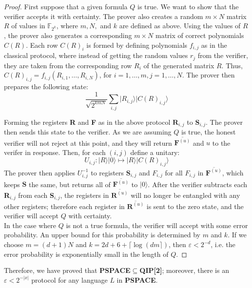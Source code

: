 \documentclass[12pt]{article}
\newcommand{\ket}[1]{\vert #1 \rangle}
\begin{document}
	\begin{proof}
		First suppose that a given formula $Q$ is true. We want to show that the verifier accepts it with certainty. The prover also creates a random $m\times N$ matrix $R$ of values in $\mathbb{F}_{2^k}$, where $m,N,$ and $k$ are defined as above. Using the values of $R$, the prover also generates a corresponding $m\times N$ matrix of correct polynomials $C(R)$. Each row $C(R)_i$ is formed by defining polynomials $f_{i,j}$ as in the classical protocol, where instead of getting the random values $r_j$ from the verifier, they are taken from the corresponding row $R_i$ of the generated matrix $R$. Thus, $C(R)_{i,j}=f_{i,j}(R_{i,1},\dots,R_{i,N})$, for $i=1,\dots,m,j=1,\dots,N$. The prover then prepares the following state:
		\[\frac{1}{\sqrt{2^{kmN}}}\sum_{i,j}\ket{R_{i,j}}\ket{C(R)_{i,j}}\]
		
		Forming the registers \textbf{R} and \textbf{F} as in the above protocol $\textbf{R}_{i,j}$ to $\textbf{S}_{i,j}$. The prover then sends this state to the verifier. As we are assuming $Q$ is true, the honest verifier will not reject at this point, and they will return $\overline{\textbf{F}^{(u)}}$ and $u$ to the verifer in response. Then, for each $(i,j)$ define a unitary:
		\[U_{i,j}:\ket{R}\ket{0}\mapsto\ket{R}\ket{C(R)_{i,j}}\]
		The prover then applies $U_{i,j}^{-1}$ to registers $\textbf{S}_{i,j}$ and $F_{i,j}$ for all $F_{i,j}$ in $\overline{\textbf{F}^{(u)}}$, which keeps $\textbf{S}$ the same, but returns all of $\overline{\textbf{F}^{(u)}}$ to $\ket{0}$. After the verifier subtracts each \textbf{R}$_{i,j}$ from each \textbf{S}$_{i,j}$, the registers in $\overline{\textbf{R}^{(u)}}$ will no longer be entangled with any other registers; therefore each register in $\overline{\textbf{R}^{(u)}}$ is sent to the zero state, and the verifier will accept $Q$ with certainty.\\
		In the case where $Q$ is not a true formula, the verifier will accept with some error probability. An upper bound for this probability is determined by $m$ and $k$. If we choose $m=(d+1)N$ and $k=2d+6+\lceil\log(dm\rceil)$, then $\varepsilon<2^{-d}$, i.e. the error probability is exponentially small in the length of $Q$.
	\end{proof}
	
	\noindent Therefore, we have proved that \textbf{PSPACE}$\subseteq$\textbf{QIP[2]}; moreover, there is an $\varepsilon<2^{-|x|}$ protocol for any language $L$ in \textbf{PSPACE}.  
\end{document}
